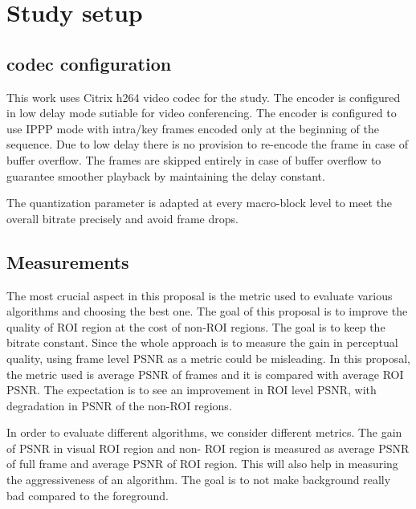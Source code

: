 \documentclass[11pt]{article} %
\begin{document}
\section{Study setup}
\subsection{codec configuration}      
This work uses Citrix h264 video codec for the study. The encoder is configured in low delay mode sutiable for video conferencing. The encoder is configured to use IPPP mode with intra/key frames encoded only at the beginning of the sequence. Due to low delay there is no provision to re-encode the frame in case of buffer overflow. The frames are skipped entirely in case of buffer overflow to guarantee smoother playback by maintaining the delay constant. 

The quantization parameter is adapted at every macro-block level to meet the overall bitrate precisely and avoid frame drops. 
\subsection{Measurements}

The most crucial aspect in this proposal is the metric used to evaluate various algorithms and choosing the best one. The goal of this proposal is to improve the quality of ROI region at the cost of non-ROI regions. The goal is to keep the bitrate constant. Since the whole approach is to measure the gain in perceptual quality, using frame level PSNR as a metric could be misleading.
In this proposal, the metric used is average PSNR of frames and it is compared with average ROI PSNR. The expectation is to see an improvement in ROI level PSNR, with degradation in PSNR of the non-ROI regions. 
	
In order to evaluate different algorithms, we consider different metrics. The gain of PSNR in visual ROI region and non- ROI region is measured as average PSNR of full frame and average PSNR of ROI region. This will also help in measuring the aggressiveness of an algorithm. The goal is to not make background really bad compared to the foreground.
\end{document}
